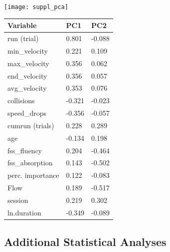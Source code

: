 \documentclass[a4paper,doc,floatsintext,natbib,10pt]{apa6}
\begin{document}
\noindent
\begin{minipage}{\textwidth}
\begin{minipage}{.6\textwidth}
\centering
\texttt{[image: suppl\_pca]}
\label{fig:supp_boxes}
\end{minipage}%
\begin{minipage}{.4\textwidth}
\begin{tabular}{lll}
{\bf Variable}   &{\bf PC1}&{\bf PC2}\\
\hline
run (trial)      & 0.801  & -0.088 \\
min\_velocity    & 0.221  & 0.109  \\
max\_velocity    & 0.356  & 0.062  \\
end\_velocity    & 0.356  & 0.057  \\
avg\_velocity    & 0.353  & 0.076  \\
collisions       & -0.321 & -0.023 \\
speed\_drops     & -0.356 & -0.057 \\
cumrun (trials)  & 0.228  & 0.289  \\
age              & -0.134 & 0.198  \\
fss\_fluency     & 0.204  & -0.464 \\
fss\_absorption  & 0.143  & -0.502 \\
perc. importance & 0.122  & -0.083 \\
Flow             & 0.189  & -0.517 \\
session          & 0.219  & 0.302  \\
ln.duration      & -0.349 & -0.089
\end{tabular}
\end{minipage}
\end{minipage}

\subsection*{Additional Statistical Analyses}
\end{document}
